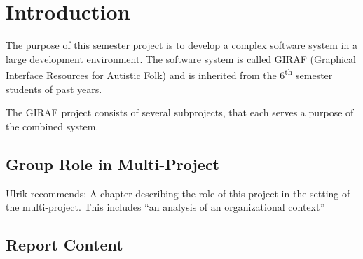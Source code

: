 \chapter{Introduction}

The purpose of this semester project is to develop a complex software system in a large development environment. The software system is called GIRAF (Graphical Interface Resources for Autistic Folk) and is inherited from the 6\textsuperscript{th} semester students of past years.

The GIRAF project consists of several subprojects, that each serves a purpose of the combined system.
\\

\section{Group Role in Multi-Project}
Ulrik recommends: A chapter describing the role of this project in the setting of the multi-project. This includes ``an analysis of an organizational context''



\section{Report Content}

